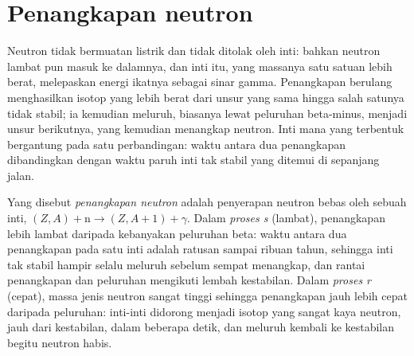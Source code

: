 \section{Penangkapan neutron}\label{sec:b3:origin-of-elements:neutrons}

Neutron tidak bermuatan listrik dan tidak ditolak oleh inti: bahkan
neutron lambat pun masuk ke dalamnya, dan inti itu, yang massanya satu satuan lebih berat, melepaskan
energi ikatnya sebagai sinar gamma. Penangkapan berulang menghasilkan isotop yang lebih berat
dari unsur yang sama hingga salah satunya tidak stabil; ia kemudian meluruh,
biasanya lewat peluruhan beta-minus, menjadi unsur berikutnya, yang kemudian
menangkap neutron. Inti mana yang terbentuk bergantung pada satu perbandingan: waktu antara
dua penangkapan dibandingkan dengan waktu paruh inti tak stabil yang ditemui di
sepanjang jalan.

\begin{definition}\label{def:b3:origin-of-elements:s-process}
Yang disebut \emph{penangkapan neutron} adalah penyerapan
neutron bebas oleh sebuah inti, $(Z, A) + \mathrm{n} \to (Z, A+1) + \gamma$.
Dalam \emph{proses s} (lambat), penangkapan
lebih lambat daripada kebanyakan peluruhan beta: waktu antara dua penangkapan pada satu
inti adalah ratusan sampai ribuan tahun, sehingga inti tak stabil
hampir selalu meluruh sebelum sempat menangkap, dan rantai penangkapan
dan peluruhan mengikuti lembah kestabilan. Dalam
\emph{proses r} (cepat), massa jenis neutron
sangat tinggi sehingga penangkapan jauh lebih cepat daripada peluruhan: inti-inti
didorong menjadi isotop yang sangat kaya neutron, jauh dari kestabilan, dalam beberapa
detik, dan meluruh kembali ke kestabilan begitu neutron habis.
\end{definition}

